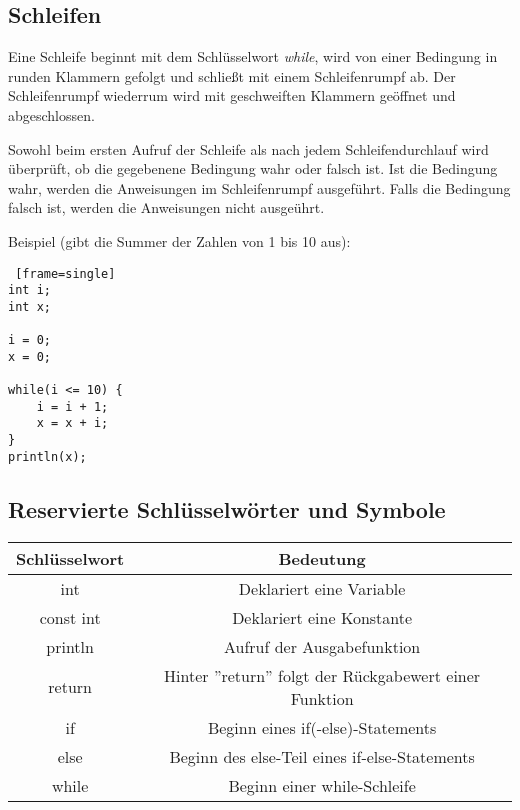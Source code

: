 \subsection{Schleifen}
Eine Schleife beginnt mit dem Schlüsselwort \textit{while}, wird von einer Bedingung in runden Klammern gefolgt und schließt mit einem Schleifenrumpf ab. Der Schleifenrumpf wiederrum wird mit geschweiften Klammern geöffnet und abgeschlossen.

Sowohl beim ersten Aufruf der Schleife als nach jedem Schleifendurchlauf wird überprüft, ob die gegebenene Bedingung wahr oder falsch ist. Ist die Bedingung wahr, werden die Anweisungen im Schleifenrumpf ausgeführt. Falls die Bedingung falsch ist, werden die Anweisungen nicht ausgeührt.



Beispiel (gibt die Summer der Zahlen von 1 bis 10 aus):
\begin{lstlisting} [frame=single] 
int i;
int x;

i = 0;
x = 0;

while(i <= 10) {
	i = i + 1;
	x = x + i;
}
println(x);
\end{lstlisting}
	
\subsection{Reservierte Schlüsselwörter und Symbole}	

\begin{center}
  \begin{tabular}{ | c | c | }
    \hline
    Schlüsselwort & Bedeutung\\ \hline \hline
    int & Deklariert eine Variable\\ \hline
    const int & Deklariert eine Konstante\\ \hline
    println & Aufruf der Ausgabefunktion\\ \hline
    return & Hinter ''return'' folgt der Rückgabewert einer Funktion\\ \hline
    if & Beginn eines if(-else)-Statements\\ \hline
    else & Beginn des else-Teil eines if-else-Statements\\ \hline
    while & Beginn einer while-Schleife\\ \hline
    
  \end{tabular}
\end{center}


